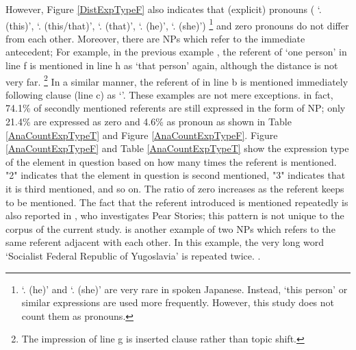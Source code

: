 However,
Figure \ref{DistExpTypeF} also indicates that
(explicit) pronouns ( `. (this)',  `. (this/that)',  `. (that)',  `. (he)',  `. (she)')%
	\footnote{
	 `. (he)' and  `. (she)' are very rare in spoken Japanese.
	Instead,  `this person' or similar expressions are used more frequently.
	However, this study does not count them as pronouns.
	}
and zero pronouns do not differ from each other.
Moreover, there are NPs which refer to the immediate antecedent;
For example, in the previous example \Last,
the referent of  `one person' in line f is mentioned in line h as  `that person' again,
although the distance is not very far.%
	\footnote{
	The impression of line g is inserted clause rather than topic shift.
	}
In a similar manner,
the referent of  in line b is mentioned immediately following clause (line c) as  `'.
These examples are not mere exceptions.
in fact, 74.1\% of secondly mentioned referents are still expressed in the form of NP;
only 21.4\% are expressed as zero and 4.6\% as pronoun
as shown in Table \ref{AnaCountExpTypeT} and Figure \ref{AnaCountExpTypeF}.
Figure \ref{AnaCountExpTypeF} and Table \ref{AnaCountExpTypeT} show
the expression type of the element in question based on how many times the referent is mentioned.
"2" indicates that the element in question is second mentioned,
"3" indicates that it is third mentioned, and so on.
The ratio of zero increases as the referent keeps to be mentioned.
The fact that the referent introduced is mentioned repeatedly is also reported in , who investigates Pear Stories;
this pattern is not unique to the corpus of the current study.
\Next is another example
of two NPs which refers to the same referent adjacent with each other.
In this example,
the very long word  `Socialist Federal Republic of Yugoslavia' is repeated twice.
%
\ex.\label{WO:TopicAppearClause-Initially:Ex:Yuugo}
